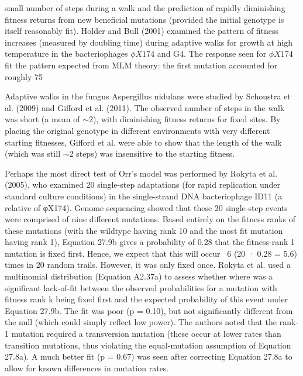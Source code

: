 \documentclass{article}
\begin{document}
small number of steps during a walk and the prediction of rapidly diminishing fitness returns from new beneficial mutations (provided the initial genotype is itself reasonably fit). Holder and Bull (2001) examined the pattern of fitness increases (measured by doubling time) during adaptive walks for growth at high temperature in the bacteriophages  $ \phi X174 $ and G4. The response seen for  $ \phi X174 $ fit the pattern expected from MLM theory: the first mutation accounted for roughly 75%

Adaptive walks in the fungus Aspergillus nidulans were studied by Schoustra et al. (2009) and Gifford et al. (2011). The observed number of steps in the walk was short (a mean of  $ \sim $2), with diminishing fitness returns for fixed sites. By placing the original genotype in different environments with very different starting fitnesses, Gifford et al. were able to show that the length of the walk (which was still  $ \sim $2 steps) was insensitive to the starting fitness.

Perhaps the most direct test of Orr's model was performed by Rokyta et al. (2005), who examined 20 single-step adaptations (for rapid replication under standard culture conditions) in the single-strand DNA bacteriophage ID11 (a relative of φX174). Genome sequencing showed that these 20 single-step events were comprised of nine different mutations. Based entirely on the fitness ranks of these mutations (with the wildtype having rank 10 and the most fit mutation having rank 1), Equation 27.9b gives a probability of 0.28 that the fitness-rank 1 mutation is fixed first. Hence, we expect that this will occur ~6 (20 · 0.28 = 5.6) times in 20 random trails. However, it was only fixed once. Rokyta et al. used a multinomial distribution (Equation A2.37a) to assess whether where was a significant lack-of-fit between the observed probabilities for a mutation with fitness rank k being fixed first and the expected probability of this event under Equation 27.9b. The fit was poor (p = 0.10), but not significantly different from the null (which could simply reflect low power). The authors noted that the rank-1 mutation required a transversion mutation (these occur at lower rates than transition mutations, thus violating the equal-mutation assumption of Equation 27.8a). A much better fit (p = 0.67) was seen after correcting Equation 27.8a to allow for known differences in mutation rates.
\end{document}

